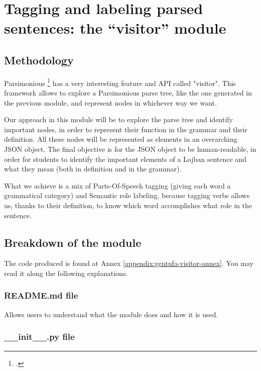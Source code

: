 \chapter{Tagging and labeling parsed sentences: the ``visitor'' module}
\label{chap:visitor-module}

\section{Methodology}

Parsimonious \footcite{parsimonious} has a very interesting feature and API called "visitor". This framework
allows to explore a Parsimonious parse tree, like the one generated in the previous module, and represent nodes in
whichever way we want.\newline

Our approach in this module will be to explore the parse tree and identify important nodes, in order to represent
their function in the grammar and their definition. All these nodes will be represented as elements in an overarching
JSON object. The final objective is for the JSON object to be human-readable, in order for students to identify the
important elements of a Lojban sentence and what they mean (both in definition and in the grammar).\newline

What we achieve is a mix of Parts-Of-Speech tagging (giving each word a grammatical category) and Semantic role labeling,
because tagging verbs allows us, thanks to their definition, to know which word accomplishes what role in the sentence.

\section{Breakdown of the module}
\label{sec:visitor-code-breakdown}

The code produced is found at Annex \ref{appendix:gentufa-visitor-annex}. You may read it along the following explanations.

\subsection*{README.md file}

Allows users to understand what the module does and how it is used.

\subsection*{\_\_init\_\_.py file}

